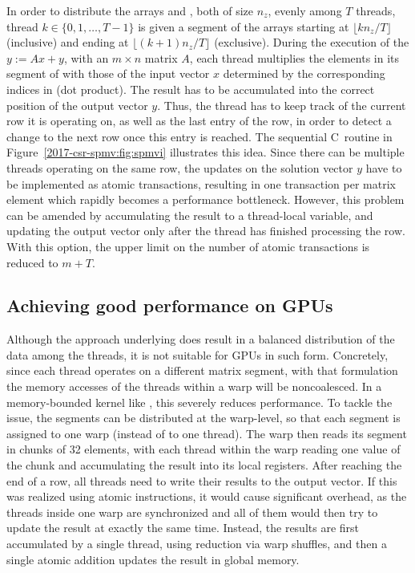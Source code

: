 In order to distribute the arrays \val and \colidx, both of size $n_z$,
evenly among $T$ threads,
thread \linebreak $k \in \lbrace 0,1, \ldots, T-1 \rbrace$ is given
a segment of the arrays starting at $\lfloor kn_z / T\rfloor$ (inclusive)
and ending at $\lfloor (k+1)n_z/T\rfloor$ (exclusive).
During the execution of the \spmv $y:=Ax + y$, with an $m \times n$ matrix $A$,
each thread multiplies 
the elements in its segment of \val with those of the input vector $x$
determined by the corresponding indices in \colidx (dot product).
The result has to be accumulated into the correct position
of the output vector $y$.
Thus, the thread has to keep track of the current row it is operating on,
as well as the last entry of the row,
in order to detect a change to the next row once this entry is reached.
The sequential C~routine in Figure~\ref{2017-csr-spmv:fig:spmvi} illustrates this idea.
Since there can be multiple threads operating on the same row,
the updates on the solution vector $y$ have to be implemented
as atomic transactions,
resulting in one transaction per matrix element
which rapidly becomes a performance bottleneck.
However, this problem can be amended
by accumulating the result to a thread-local variable,
and updating the output vector only
after the thread has finished processing the row.
With this option, the upper limit on the number of atomic transactions
is reduced to $m + T$.

\subsection{Achieving good performance on GPUs}

Although the approach underlying \bcsr does result
in a balanced distribution of the data among the threads,
it is not suitable for GPUs in such form.
Concretely, since each thread operates on a different matrix segment,
with that formulation the memory accesses of the threads within a warp
will be noncoalesced.
In a memory-bounded kernel like \spmv, this severely reduces performance.
To tackle the issue, the segments can be distributed at the warp-level,
so that each segment is assigned to one warp (instead of to one thread).
The warp then reads its segment in chunks of 32 elements,
with each thread within the warp reading one value of the chunk
and accumulating the result into its local registers.
After reaching the end of a row,
all threads need to write their results to the output vector.
If this was realized using atomic instructions,
it would cause significant overhead,
as the threads inside one warp are synchronized
and all of them would then try to update the result at exactly the same time.
Instead, the results are first accumulated
by a single thread, using reduction via warp shuffles,
and then a single atomic addition updates the result in global memory.


